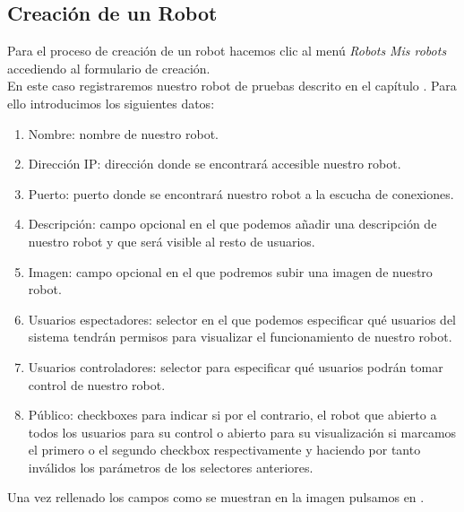 \subsection{Creación de un Robot}
\label{sec:creacion-robot}

Para el proceso de creación de un robot hacemos clic al menú \emph{Robots} \textrightarrow \enspace \emph{Mis robots} accediendo al formulario de creación.\\

En este caso registraremos nuestro robot de pruebas descrito en el capítulo \label{cap:robot}. Para ello introducimos los siguientes datos:

\begin{enumerate}
 \item Nombre: nombre de nuestro robot.
 \item Dirección IP: dirección donde se encontrará accesible nuestro robot.
 \item Puerto: puerto donde se encontrará nuestro robot a la escucha de conexiones.
 \item Descripción: campo opcional en el que podemos añadir una descripción de nuestro robot y que será visible al resto de usuarios.
 \item Imagen: campo opcional en el que podremos subir una imagen de nuestro robot.
 \item Usuarios espectadores: selector en el que podemos especificar qué usuarios del sistema tendrán permisos para visualizar el funcionamiento de nuestro robot.
 \item Usuarios controladores: selector para especificar qué usuarios podrán tomar control de nuestro robot.
 \item Público: checkboxes para indicar si por el contrario, el robot que abierto a todos los usuarios para su control o abierto para su visualización si marcamos el primero o el segundo checkbox respectivamente
 y haciendo por tanto inválidos los parámetros de los selectores anteriores.
\end{enumerate}

Una vez rellenado los campos como se muestran en la imagen \label{website:creacion-robot} pulsamos en .

